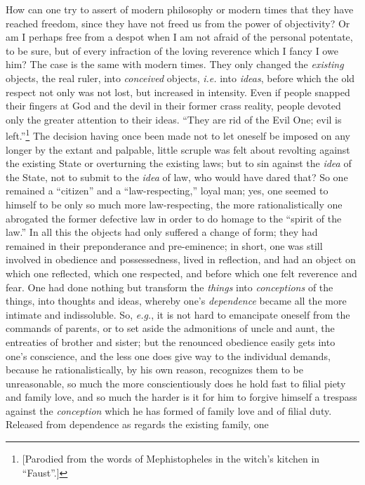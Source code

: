 How can one try to assert of modern philosophy or modern times that they have 
reached freedom, since they have not freed us from the power of objectivity? 
Or am I perhaps free from a despot when I am not afraid of the personal 
potentate, to be sure, but of every infraction of the loving reverence which I 
fancy I owe him? The case is the same with modern times. They only changed the 
\textit{existing} objects, the real ruler, into \textit{conceived} objects, 
\textit{i.e.} into \textit{ideas}, before which the old respect not only was 
not lost, but increased in intensity. Even if people snapped their fingers at 
God and the devil in their former crass reality, people devoted only the 
greater attention to their ideas. ``They are rid of the Evil One; evil is 
left.''\footnote{[Parodied from the words of Mephistopheles in the witch's 
kitchen in ``Faust''.]} The decision having once been made not to let 
oneself be imposed on any longer by the extant and palpable, little scruple 
was felt about revolting against the existing State or overturning the 
existing laws; but to sin against the \textit{idea} of the State, not to 
submit to the \textit{idea} of law, who would have dared that? So one remained 
a ``citizen'' and a ``law-respecting,'' loyal man; yes, one seemed to 
himself to be only so much more law-respecting, the more rationalistically one 
abrogated the former defective law in order to do homage to the ``spirit of 
the law.'' In all this the objects had only suffered a change of form; they 
had remained in their preponderance and pre-eminence; in short, one was still 
involved in obedience and possessedness, lived in reflection, and had an 
object on which one reflected, which one respected, and before which one felt 
reverence and fear. One had done nothing but transform the \textit{things} 
into \textit{conceptions} of the things, into thoughts and ideas, whereby 
one's \textit{dependence} became all the more intimate and indissoluble. So, 
\textit{e.g.}, it is not hard to emancipate oneself from the commands of 
parents, or to set aside the admonitions of uncle and aunt, the entreaties of 
brother and sister; but the renounced obedience easily gets into one's 
conscience, and the less one does give way to the individual demands, because 
he rationalistically, by his own reason, recognizes them to be unreasonable, 
so much the more conscientiously does he hold fast to filial piety and family 
love, and so much the harder is it for him to forgive himself a trespass 
against the \textit{conception} which he has formed of family love and of 
filial duty. Released from dependence as regards the existing family, one 

